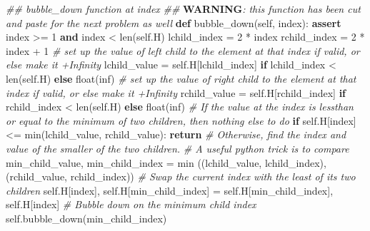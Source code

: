 \documentclass[
]{article}
\newenvironment{Shaded}{}{}
\newcommand{\AlertTok}[1]{\textcolor[rgb]{1.00,0.00,0.00}{\textbf{#1}}}
\newcommand{\BuiltInTok}[1]{\textcolor[rgb]{0.00,0.50,0.00}{#1}}
\newcommand{\CommentTok}[1]{\textcolor[rgb]{0.38,0.63,0.69}{\textit{#1}}}
\newcommand{\ControlFlowTok}[1]{\textcolor[rgb]{0.00,0.44,0.13}{\textbf{#1}}}
\newcommand{\DecValTok}[1]{\textcolor[rgb]{0.25,0.63,0.44}{#1}}
\newcommand{\KeywordTok}[1]{\textcolor[rgb]{0.00,0.44,0.13}{\textbf{#1}}}
\newcommand{\NormalTok}[1]{#1}
\newcommand{\OperatorTok}[1]{\textcolor[rgb]{0.40,0.40,0.40}{#1}}
\newcommand{\StringTok}[1]{\textcolor[rgb]{0.25,0.44,0.63}{#1}}
\newcommand{\VariableTok}[1]{\textcolor[rgb]{0.10,0.09,0.49}{#1}}
\begin{document}
\begin{Shaded}
\begin{Highlighting}[]
    \CommentTok{\#\# bubble\_down function at index}
    \CommentTok{\#\# }\AlertTok{WARNING}\CommentTok{: this function has been cut and paste for the next problem as well}
    \KeywordTok{def}\NormalTok{ bubble\_down(}\VariableTok{self}\NormalTok{, index):}
        \ControlFlowTok{assert}\NormalTok{ index }\OperatorTok{\textgreater{}=} \DecValTok{1} \KeywordTok{and}\NormalTok{ index }\OperatorTok{\textless{}} \BuiltInTok{len}\NormalTok{(}\VariableTok{self}\NormalTok{.H)}
\NormalTok{        lchild\_index }\OperatorTok{=} \DecValTok{2} \OperatorTok{*}\NormalTok{ index}
\NormalTok{        rchild\_index }\OperatorTok{=} \DecValTok{2} \OperatorTok{*}\NormalTok{ index }\OperatorTok{+} \DecValTok{1}
        \CommentTok{\# set up the value of left child to the element at that index if valid, or else make it +Infinity}
\NormalTok{        lchild\_value }\OperatorTok{=} \VariableTok{self}\NormalTok{.H[lchild\_index] }\ControlFlowTok{if}\NormalTok{ lchild\_index }\OperatorTok{\textless{}} \BuiltInTok{len}\NormalTok{(}\VariableTok{self}\NormalTok{.H) }\ControlFlowTok{else} \BuiltInTok{float}\NormalTok{(}\StringTok{\textquotesingle{}inf\textquotesingle{}}\NormalTok{)}
        \CommentTok{\# set up the value of right child to the element at that index if valid, or else make it +Infinity}
\NormalTok{        rchild\_value }\OperatorTok{=} \VariableTok{self}\NormalTok{.H[rchild\_index] }\ControlFlowTok{if}\NormalTok{ rchild\_index }\OperatorTok{\textless{}} \BuiltInTok{len}\NormalTok{(}\VariableTok{self}\NormalTok{.H) }\ControlFlowTok{else} \BuiltInTok{float}\NormalTok{(}\StringTok{\textquotesingle{}inf\textquotesingle{}}\NormalTok{)}
        \CommentTok{\# If the value at the index is lessthan or equal to the minimum of two children, then nothing else to do}
        \ControlFlowTok{if} \VariableTok{self}\NormalTok{.H[index] }\OperatorTok{\textless{}=} \BuiltInTok{min}\NormalTok{(lchild\_value, rchild\_value):}
            \ControlFlowTok{return}
        \CommentTok{\# Otherwise, find the index and value of the smaller of the two children.}
        \CommentTok{\# A useful python trick is to compare}
\NormalTok{        min\_child\_value, min\_child\_index }\OperatorTok{=} \BuiltInTok{min}\NormalTok{ ((lchild\_value, lchild\_index), (rchild\_value, rchild\_index))}
        \CommentTok{\# Swap the current index with the least of its two children}
        \VariableTok{self}\NormalTok{.H[index], }\VariableTok{self}\NormalTok{.H[min\_child\_index] }\OperatorTok{=} \VariableTok{self}\NormalTok{.H[min\_child\_index], }\VariableTok{self}\NormalTok{.H[index]}
        \CommentTok{\# Bubble down on the minimum child index}
        \VariableTok{self}\NormalTok{.bubble\_down(min\_child\_index)}



\end{Highlighting}
\end{Shaded}
\end{document}
